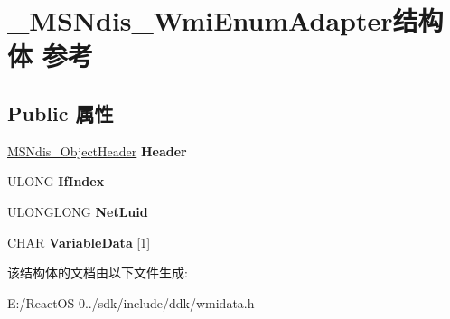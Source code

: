\hypertarget{struct___m_s_ndis___wmi_enum_adapter}{}\section{\+\_\+\+M\+S\+Ndis\+\_\+\+Wmi\+Enum\+Adapter结构体 参考}
\label{struct___m_s_ndis___wmi_enum_adapter}
\subsection*{Public 属性}
\begin{DoxyCompactItemize}
\item 
\mbox{\label{struct___m_s_ndis___wmi_enum_adapter_a7bd087182521bd5eb144a3eaef617aa4}} 
\hyperlink{struct___m_s_ndis___object_header}{M\+S\+Ndis\+\_\+\+Object\+Header} {\bfseries Header}
\item 
\mbox{\label{struct___m_s_ndis___wmi_enum_adapter_ada8cfa5a1a04af723fe8789430af7b58}} 
U\+L\+O\+NG {\bfseries If\+Index}
\item 
\mbox{\label{struct___m_s_ndis___wmi_enum_adapter_aabcbbc41495fa3b30e7716913e218f70}} 
U\+L\+O\+N\+G\+L\+O\+NG {\bfseries Net\+Luid}
\item 
\mbox{\label{struct___m_s_ndis___wmi_enum_adapter_a49d7f7d18ac2d5f86f370ed380c18ce4}} 
C\+H\+AR {\bfseries Variable\+Data} \mbox{[}1\mbox{]}
\end{DoxyCompactItemize}


该结构体的文档由以下文件生成\+:\begin{DoxyCompactItemize}
\item 
E\+:/\+React\+O\+S-\/0../sdk/include/ddk/wmidata.\+h\end{DoxyCompactItemize}
